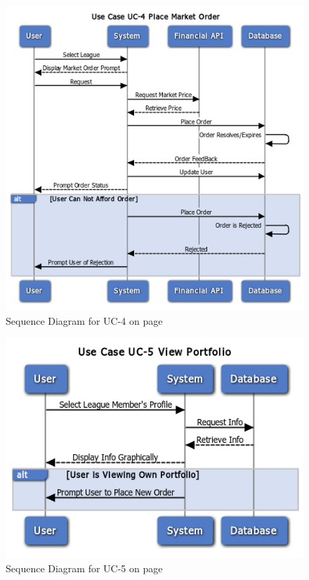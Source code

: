 \begin{figure}
\centering
\includegraphics[width=5.5in]{./Diagrams/SystemSequenceDiagrams/uc4.png}
\caption{Sequence Diagram for UC-4 on page \pageref{UC-4}}
\end{figure}

\begin{figure}
\centering
\includegraphics[width=5.5in]{./Diagrams/SystemSequenceDiagrams/uc5.png}
\caption{Sequence Diagram for UC-5 on page \pageref{UC-5}}
\end{figure}

